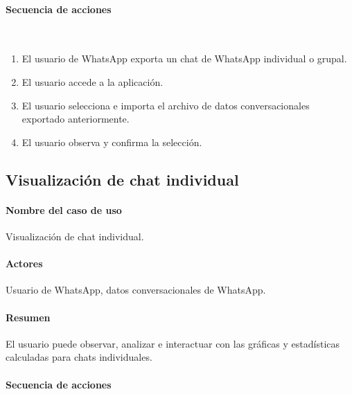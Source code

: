\paragraph{Secuencia de acciones}\mbox{}\\

\begin{enumerate}
	\item El usuario de WhatsApp exporta un chat de WhatsApp individual o grupal.
	\item El usuario accede a la aplicación.
	\item El usuario selecciona e importa el archivo de datos conversacionales exportado anteriormente.
	\item El usuario observa y confirma la selección.
\end{enumerate}

\subsection{Visualización de chat individual}

\paragraph{Nombre del caso de uso} Visualización de chat individual.
\paragraph{Actores} Usuario de WhatsApp, datos conversacionales de WhatsApp.
\paragraph{Resumen} El usuario puede observar, analizar e interactuar con las gráficas y estadísticas calculadas para chats individuales.
\paragraph{Secuencia de acciones}\mbox{}\\

